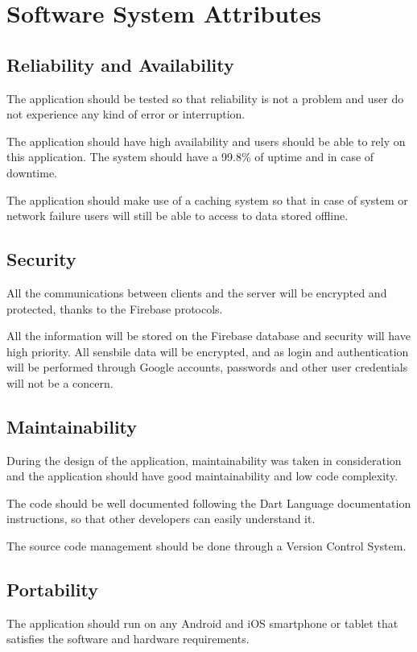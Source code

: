 \chapter{Software System Attributes}

\section{Reliability and Availability}
The application should  be tested so that reliability is not a problem and user do not experience any kind of error or interruption.

The application should have high availability and users should be able to rely on this application.
The system should have a 99.8\% of uptime and in case of downtime. 

The application should make use of a caching system so that in case of system or network failure users will still be able to access to data stored offline.

\section{Security}
All the communications between clients and the server will be encrypted and protected, thanks to the Firebase protocols.

All the information will be stored on the Firebase database and security will have high priority. All sensbile data will be encrypted,
and as login and authentication will be performed through Google accounts, passwords and other user credentials will not be a concern.

\section{Maintainability}
During the design of the application, maintainability was taken in consideration and the application should have good maintainability and low code complexity.

The code should be well documented following the Dart Language documentation instructions, so that other developers can easily understand it.

The source code management should be done through a Version Control System.


\section{Portability}
The application should run on any Android and iOS smartphone or 
tablet that satisfies the software and hardware requirements.